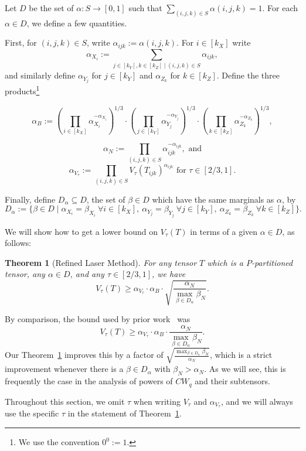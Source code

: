 \PassOptionsToPackage{shortlabels}{enumitem}\documentclass[10pt,a4paper]{article}
\newtheorem{theorem}{Theorem}[section]
\begin{document}
Let $D$ be the set of $\alpha : S \to [0,1]$  such that $\sum_{(i,j,k) \in S} \alpha(i,j,k) = 1$. For each $\alpha\in D$, we define a few quantities. 

First, for $(i,j,k) \in S$, write $\alpha_{ijk} := \alpha(i,j,k)$. 
For $i \in [k_X]$ write $$\alpha_{X_i} := \sum_{j \in [k_Y], k \in [k_Z] \mid (i,j,k) \in S} \alpha_{ijk},$$ and similarly define $\alpha_{Y_j}$ for $j \in [k_Y]$ and $\alpha_{Z_k}$ for $k \in [k_Z]$. Define the three products\footnote{We use the convention $0^0 := 1$.}

$$\alpha_B := \left( \prod_{i \in [k_X]} \alpha_{X_i}^{-\alpha_{X_i}} \right)^{1/3} \cdot \left( \prod_{j \in [k_Y]} \alpha_{Y_j}^{-\alpha_{Y_j}} \right)^{1/3} \cdot \left( \prod_{k \in [k_Z]} \alpha_{Z_k}^{-\alpha_{Z_k}} \right)^{1/3},$$

$$\alpha_N := \prod_{(i,j,k) \in S} \alpha_{ijk}^{-\alpha_{ijk}} , \text{ and}$$
$$\alpha_{V_\tau} := \prod_{(i,j,k) \in S} V_\tau(T_{ijk})^{\alpha_{ijk}} \text{ for } \tau \in [2/3,1].$$

Finally, define $D_\alpha \subseteq D$, the set of $\beta \in D$ which have the same marginals as $\alpha$, by $$D_\alpha := \{ \beta \in D \mid \alpha_{X_i}=\beta_{X_i} ~\forall i \in [k_X],~ \alpha_{Y_j}=\beta_{Y_j} ~\forall j\in [k_Y],~ \alpha_{Z_k}=\beta_{Z_k} ~\forall k \in [k_Z] \}.$$

We will show how to get a lower bound on $V_\tau(T)$ in terms of a given $\alpha \in D$, as follows:
\begin{theorem}[Refined Laser Method] \label{thm:main}
For any tensor $T$ which is a $P$-partitioned tensor, any $\alpha \in D$, and any $\tau \in [2/3,1]$, we have
$$V_\tau(T) \geq \alpha_{V_\tau} \cdot \alpha_B \cdot \sqrt{\frac{\alpha_N}{\max_{\beta \in D_\alpha} \beta_N}}.$$
\end{theorem}

By comparison, the bound used by prior work~\cite{v12,legall} was 
$$V_\tau(T) \geq \alpha_{V_\tau} \cdot \alpha_B \cdot \frac{\alpha_N}{\max_{\beta \in D_\alpha} \beta_N}.$$ Our Theorem~\ref{thm:main} improves this by a factor of $\sqrt{\frac{\max_{\beta \in D_\alpha} \beta_N}{\alpha_N}}$, which is a strict improvement whenever there is a $\beta \in D_\alpha$ with $\beta_N > \alpha_N$. As we will see, this is frequently the case in the analysis of powers of $CW_q$ and their subtensors.

Throughout this section, we omit $\tau$ when writing $V_\tau$ and $\alpha_{V_\tau}$, and we will always use the specific $\tau$ in the statement of Theorem~\ref{thm:main}.
\end{document}
